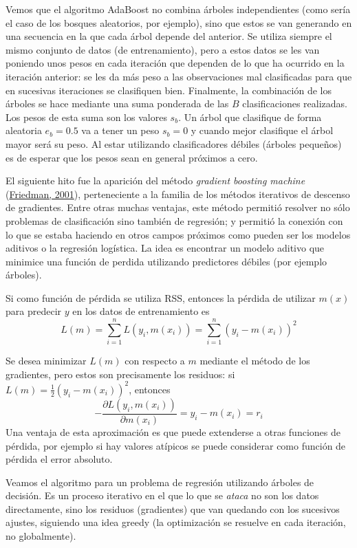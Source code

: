 \documentclass[
]{book}
\theoremstyle{break}
\theoremstyle{nonumberplain}
\begin{document}
Vemos que el algoritmo AdaBoost no combina árboles independientes (como sería el caso de los bosques aleatorios, por ejemplo), sino que estos se van generando en una secuencia en la que cada árbol depende del anterior. Se utiliza siempre el mismo conjunto de datos (de entrenamiento), pero a estos datos se les van poniendo unos pesos en cada iteración que dependen de lo que ha ocurrido en la iteración anterior: se les da más peso a las observaciones mal clasificadas para que en sucesivas iteraciones se clasifiquen bien. Finalmente, la combinación de los árboles se hace mediante una suma ponderada de las \(B\) clasificaciones realizadas. Los pesos de esta suma son los valores \(s_b\). Un árbol que clasifique de forma aleatoria \(e_b = 0.5\) va a tener un peso \(s_b = 0\) y cuando mejor clasifique el árbol mayor será su peso. Al estar utilizando clasificadores débiles (árboles pequeños) es de esperar que los pesos sean en general próximos a cero.

El siguiente hito fue la aparición del método \emph{gradient boosting machine} (\protect\hyperlink{ref-friedman2001greedy}{Friedman, 2001}), perteneciente a la familia de los métodos iterativos de descenso de gradientes.
Entre otras muchas ventajas, este método permitió resolver no sólo problemas de clasificación sino también de regresión; y permitió la conexión con lo que se estaba haciendo en otros campos próximos como pueden ser los modelos aditivos o la regresión logística.
La idea es encontrar un modelo aditivo que minimice una función de perdida utilizando predictores débiles (por ejemplo árboles).

Si como función de pérdida se utiliza RSS, entonces la pérdida de utilizar \(m(x)\) para predecir \(y\) en los datos de entrenamiento es \[L(m) = \sum_{i=1}^n L(y_i, m(x_i)) = \sum_{i=1}^n (y_i - m(x_i))^2\]

Se desea minimizar \(L(m)\) con respecto a \(m\) mediante el método de los gradientes, pero estos son precisamente los residuos: si \(L(m)= \frac{1}{2} (y_i - m(x_i))^2\), entonces
\[- \frac{\partial L(y_i, m(x_i))} {\partial m(x_i)} = y_i - m(x_i) = r_i\]
Una ventaja de esta aproximación es que puede extenderse a otras funciones de pérdida, por ejemplo si hay valores atípicos se puede considerar como función de pérdida el error absoluto.

Veamos el algoritmo para un problema de regresión utilizando árboles de decisión. Es un proceso iterativo en el que lo que se \emph{ataca} no son los datos directamente, sino los residuos (gradientes) que van quedando con los sucesivos ajustes, siguiendo una idea greedy (la optimización se resuelve en cada iteración, no globalmente).
\end{document}

